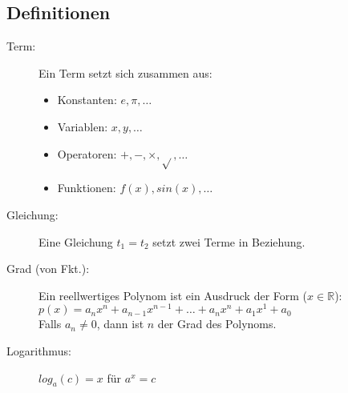 \subsection*{Definitionen}
\begin{description}
  \item [Term:] 
    Ein Term setzt sich zusammen aus:
    \begin{itemize}
      \item Konstanten: $e, \pi, \dots$
      \item Variablen: $x, y, \dots$
      \item Operatoren: $+, -, \times, \sqrt{}, \dots$ 
      \item Funktionen: $f(x), sin(x), \dots$
    \end{itemize}
    
  \item [Gleichung:] 
    Eine Gleichung $t_1 = t_2$ setzt zwei Terme in Beziehung.

  \item [Grad (von Fkt.):]
    Ein reellwertiges Polynom ist ein Ausdruck der Form ($x \in \mathbb{R}$):\\
    $p(x) = a_nx^n + a_{n-1}x^{n-1} + \dots + a_nx^n + a_1x^1 + a_0$\\
    Falls $a_n \neq 0$, dann ist $n$ der Grad des Polynoms.

  \item [Logarithmus:]
    $log_a(c) = x$ für $a^x = c$
\end{description}

